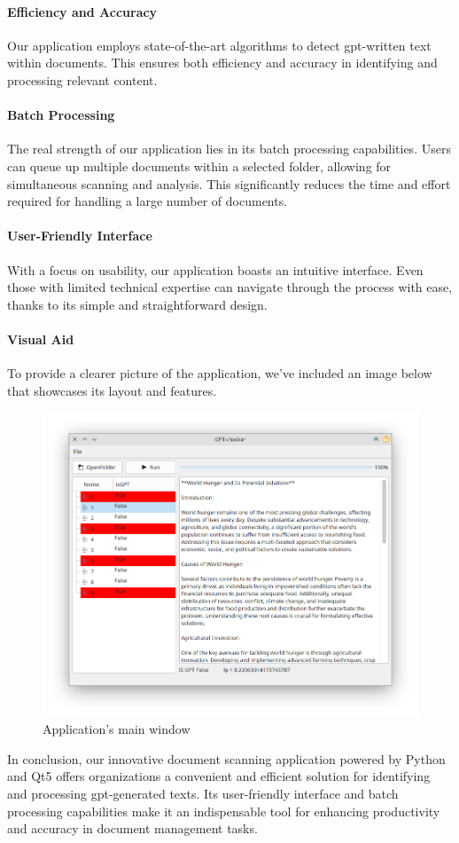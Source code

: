 \paragraph{Efficiency and Accuracy} Our application employs state-of-the-art algorithms to detect gpt-written 
text within documents. This ensures both efficiency and accuracy in identifying and processing relevant content.

\paragraph{Batch Processing} The real strength of our application lies in its batch processing capabilities. 
Users can queue up multiple documents within a selected folder, allowing for simultaneous scanning and analysis. 
This significantly reduces the time and effort required for handling a large number of documents.

\paragraph{User-Friendly Interface} With a focus on usability, our application boasts an intuitive interface. 
Even those with limited technical expertise can navigate through the process with ease, thanks to its simple and 
straightforward design.

\paragraph{Visual Aid} To provide a clearer picture of the application, we've included an image below that showcases 
its layout and features.

\begin{figure}
	\centering
	\includegraphics[width=0.9\linewidth]{images/Application/screen}
	\caption{Application's main window}
	\label{fig:screen}
\end{figure}


In conclusion, our innovative document scanning application powered by Python and Qt5 offers organizations a 
convenient and efficient solution for identifying and processing gpt-generated texts. Its user-friendly 
interface and batch processing capabilities make it an indispensable tool for enhancing productivity and accuracy 
in document management tasks.

